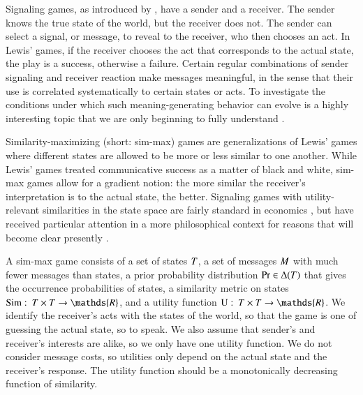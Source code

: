 \documentclass[fleqn,reqno,10pt]{article}
\newcommand{\similarity}{\ensuremath{\mathrm{Sim}}} %
\begin{document}
Signaling games, as introduced by \citet{Lewis_1969:Convention}, have
a sender and a receiver. The sender knows the true state of the world,
but the receiver does not. The sender can select a signal, or message,
to reveal to the receiver, who then chooses an act. In Lewis' games,
if the receiver chooses the act that corresponds to the actual state,
the play is a success, otherwise a failure. Certain regular
combinations of sender signaling and receiver reaction make messages
meaningful, in the sense that their use is correlated systematically
to certain states or acts. To investigate the conditions under which
such meaning-generating behavior can evolve is a highly interesting
topic that we are only beginning to fully understand
\citep[e.g.][]{Warneryd1993:Cheap-Talk-Coor,BlumeKim1993:Evolutionary-St,Huttegger2007:Evolution-and-t,Pawlowitsch2008:Why-Evolution-d,Barrett2009:The-Evolution-o,HutteggerSkyrms2010:Evolutionary-Dy,Skyrms2010:Signals}.

Similarity-maximizing (short: sim-max) games are generalizations of
Lewis' games where different states are allowed to be more or less
similar to one another. While Lewis' games treated communicative
success as a matter of black and white, sim-max games allow for a
gradient notion: the more similar the receiver's interpretation is to
the actual state, the better. Signaling games with utility-relevant
similarities in the state space are fairly standard in economics
\citep[e.g.][]{Spence1973:Job-market-sign,CrawfordSobel1982:Strategic-Infor},
but have received particular attention in a more philosophical context
for reasons that will become clear presently
\citep{Jager2007:The-Evolution-o,JagerRooijvan-Rooij2007:Language-Struct,JagerMetzger2011:Voronoi-Languag}.

A sim-max game consists of a set of states $T$, a set of
messages $M$ with much fewer messages than states, a prior
probability distribution $\Pr \in \Delta(T)$ that gives the
occurrence probabilities of states, a similarity metric on states
$\similarity \mycolon \States \times \States \rightarrow \mathds{R}$,
and a utility function $\Utils \mycolon \States \times \States
\rightarrow \mathds{R}$. We identify the receiver's acts with the
states of the world, so that the game is one of guessing the actual
state, so to speak. We also assume that sender's and receiver's
interests are alike, so we only have one utility function. We do not
consider message costs, so utilities only depend on the actual state
and the receiver's response. The utility function should be a
monotonically decreasing function of similarity.
\end{document}
